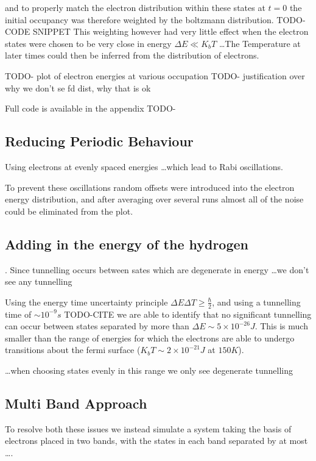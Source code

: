 and to properly match
the electron distribution within these states
at \(t=0\) the initial occupancy was therefore weighted
by the boltzmann distribution.
TODO-CODE SNIPPET
This weighting however had very little
effect when the electron states were chosen
to be very close in energy \(\Delta E \ll K_b T\)
\ldots The Temperature
at later times could then be inferred from
the distribution of electrons.

TODO- plot of electron energies at various occupation
TODO- justification over why we don't se fd dist, why that is ok

Full code is available in the appendix TODO-


\subsection{Reducing Periodic Behaviour}
Using electrons at evenly spaced energies \ldots which lead to Rabi oscillations.

To prevent these oscillations random offsets were introduced
into the electron energy distribution, and after
averaging over several runs almost all of the
noise could be eliminated from the plot.

\subsection{}

\subsection{Adding in the energy of the hydrogen}

. Since tunnelling occurs between sates which are
degenerate in energy \ldots we don't see any tunnelling

Using the energy time uncertainty principle
\(\Delta{}E\Delta{}T \geq \frac{\hbar}{2}\), and
using a tunnelling time of \(\sim 10^{-9}s\) TODO-CITE
we are able to identify that no significant tunnelling
can occur between states separated by more than
\(\Delta{}E \sim 5\times{}10^{-26} J\). This is
much smaller than the range of energies for
which the electrons are able to undergo
transitions about the fermi surface
(\(K_b T \sim 2 \times 10^{-21}J\) at \(150K\)).


\ldots when choosing states evenly in this
range we only see degenerate tunnelling

\subsection{Multi Band Approach}
To resolve both these issues we instead simulate a system
taking the basis of electrons placed in two bands, with
the states in each band separated by at most \ldots.



